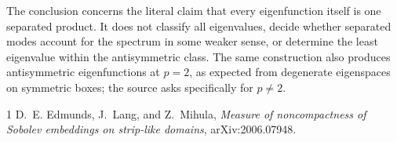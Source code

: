 \documentclass[11pt,a4paper]{article}
\begin{document}
The conclusion concerns the literal claim that every eigenfunction itself is
one separated product.  It does not classify all eigenvalues, decide whether
separated modes account for the spectrum in some weaker sense, or determine
the least eigenvalue within the antisymmetric class.  The same construction
also produces antisymmetric eigenfunctions at $p=2$, as expected from
degenerate eigenspaces on symmetric boxes; the source asks specifically for
$p\ne2$.

\begin{thebibliography}{1}
D.~E. Edmunds, J.~Lang, and Z.~Mihula,
\emph{Measure of noncompactness of Sobolev embeddings on strip-like domains},
arXiv:2006.07948.
\end{thebibliography}
\end{document}
